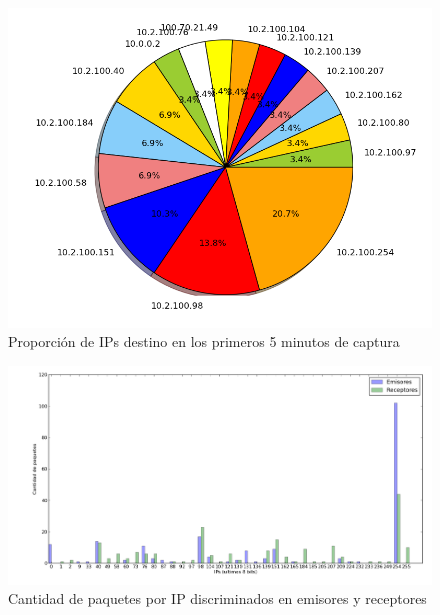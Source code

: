 \begin{figure}[!h]
  \includegraphics[width=\textwidth,keepaspectratio]{graph/receptores_facu.png}
  \caption{Proporción de IPs destino en los primeros 5 minutos de captura}
  \label{fig:torta-receptor-facu}
\end{figure}

\begin{figure}[!h]
  \includegraphics[width=\textwidth,keepaspectratio]{graph/barras-facu.png}
  \caption{Cantidad de paquetes por IP discriminados en emisores y receptores}
  \label{fig:barras-facu}
\end{figure}

